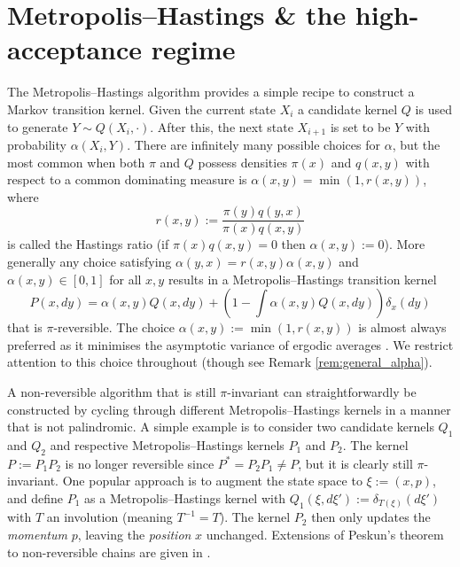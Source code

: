 \documentclass{article}
\theoremstyle{definition}
\theoremstyle{plain}
\begin{document}
\section{Metropolis--Hastings \& the high-acceptance regime}
\label{sec:MH_high_accept}

The Metropolis--Hastings algorithm provides a simple recipe to construct a Markov transition kernel. Given the current state $X_i$ a candidate kernel $Q$ is used to generate $Y \sim Q(X_i,\cdot)$.  After this, the next state $X_{i+1}$ is set to be $Y$ with probability $\alpha(X_i,Y)$.  There are infinitely many possible choices for $\alpha$, but the most common when both $\pi$ and $Q$ possess densities $\pi(x)$ and $q(x,y)$ with respect to a common dominating measure is $\alpha(x,y) = \min\left( 1, r(x,y)\right)$, where 
\[
r(x,y) := \frac{\pi(y)q(y,x)}{\pi(x)q(x,y)}
\]
is called the Hastings ratio (if $\pi(x)q(x,y) = 0$ then $\alpha(x,y) := 0$).  More generally any choice satisfying $\alpha(y,x) = r(x,y)\alpha(x,y)$ and $\alpha(x,y) \in [0,1]$ for all $x,y$ results in a Metropolis--Hastings transition kernel
\[
P(x,dy) = \alpha(x,y)Q(x,dy) + \left( 1 - \int \alpha(x,y)Q(x,dy) \right) \delta_x(dy)
\]
that is $\pi$-reversible.  The choice $\alpha(x,y) := \min(1, r(x,y))$ is almost always preferred as it minimises the asymptotic variance of ergodic averages \cite{peskun1973optimum,tierney1998note}.  We restrict attention to this choice throughout (though see Remark \ref{rem:general_alpha}).

A non-reversible algorithm that is still $\pi$-invariant can straightforwardly be constructed by cycling through different Metropolis--Hastings kernels in a manner that is not palindromic.  A simple example is to consider two candidate kernels $Q_1$ and $Q_2$ and respective Metropolis--Hastings kernels $P_1$ and $P_2$.  The kernel $P := P_1P_2$ is no longer reversible since $P^* = P_2P_1 \neq P$, but it is clearly still $\pi$-invariant.  One popular approach is to augment the state space to $\xi := (x,p)$, and define $P_1$ as a Metropolis--Hastings kernel with $Q_1(\xi, d\xi') := \delta_{T(\xi)}(d\xi')$ with $T$ an involution (meaning $T^{-1} = T$).  The kernel $P_2$ then only updates the \textit{momentum} $p$, leaving the \textit{position} $x$ unchanged.  Extensions of Peskun's theorem to non-reversible chains are given in \citep{maire2014comparison,andrieu2021peskun}.
\end{document}
